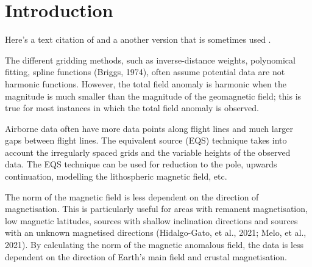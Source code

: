 
\section{Introduction}

Here's a text citation of \citet{OliveiraJr2015}
and a another version that is sometimes used \citep{OliveiraJr2015}.

The different gridding methods, such as inverse-distance weights, polynomical fitting, spline functions (Briggs, 1974), often assume potential data are not harmonic functions. However, the total field anomaly is harmonic when the magnitude is much smaller than the magnitude of the geomagnetic field; this is true for most instances in which the total field anomaly is observed. 

Airborne data often have more data points along flight lines and much larger gaps between flight lines. The equivalent source (EQS) technique takes into account the irregularly spaced grids and the variable heights of the observed data. The EQS technique can be used for reduction to the pole, upwards continuation, modelling the lithospheric magnetic field, etc.

The norm of the magnetic field is less dependent on the direction of magnetisation. This is particularly useful for areas with remanent magnetisation, low magnetic latitudes, sources with shallow inclination directions and sources with an unknown magnetised directions (Hidalgo-Gato, et al., 2021; Melo, et al., 2021). By calculating the norm of the magnetic anomalous field, the data is less dependent on the direction of Earth’s main field and crustal magnetisation.

\lipsum[1-3]


